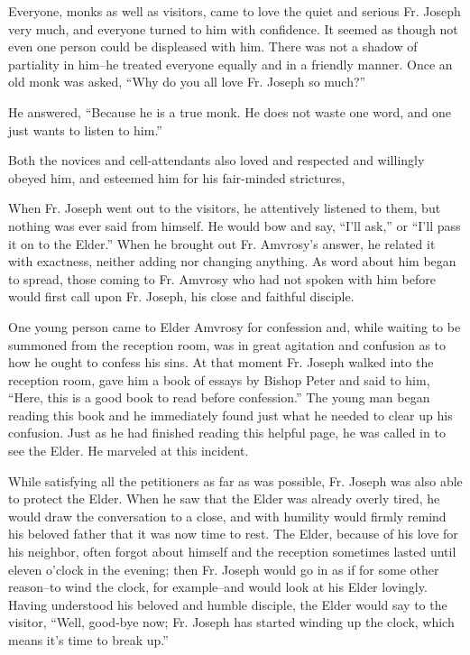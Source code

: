 Everyone, monks as well as visitors, came to love the quiet and serious Fr. Joseph very much, and everyone turned to him with confidence. It seemed as though not even one person could be displeased with him. There was not a shadow of partiality in him--he treated everyone equally and in a friendly manner. Once an old monk was asked, ``Why do you all love Fr. Joseph so much?''

He answered, ``Because he is a true monk. He does not waste one word, and one just wants to listen to him.''

Both the novices and cell-attendants also loved and respected and willingly obeyed him, and esteemed him for his fair-minded strictures,

When Fr. Joseph went out to the visitors, he attentively listened to them, but nothing was ever said from himself. He would bow and say, ``I'll ask,'' or ``I'll pass it on to the Elder.'' When he brought out Fr. Amvrosy's answer, he related it with exactness, neither adding nor changing anything. As word about him began to spread, those coming to Fr. Amvrosy who had not spoken with him before would first call upon Fr. Joseph, his close and faithful disciple.

One young person came to Elder Amvrosy for confession and, while waiting to be summoned from the reception room, was in great agitation and confusion as to how he ought to confess his sins. At that moment Fr. Joseph walked into the reception room, gave him a book of essays by Bishop Peter and said to him, ``Here, this is a good book to read before confession.'' The young man began reading this book and he immediately found just what he needed to clear up his confusion. Just as he had finished reading this helpful page, he was called in to see the Elder. He marveled at this incident.

While satisfying all the petitioners as far as was possible, Fr. Joseph was also able to protect the Elder. When he saw that the Elder was already overly tired, he would draw the conversation to a close, and with humility would firmly remind his beloved father that it was now time to rest. The Elder, because of his love for his neighbor, often forgot about himself and the reception sometimes lasted until eleven o'clock in the evening; then Fr. Joseph would go in as if for some other reason--to wind the clock, for example--and would look at his Elder lovingly. Having understood his beloved and humble disciple, the Elder would say to the visitor, ``Well, good-bye now; Fr. Joseph has started winding up the clock, which means it's time to break up.''

